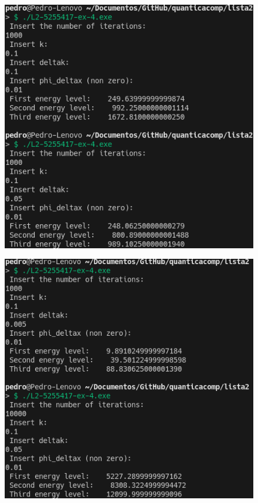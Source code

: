 \documentclass[12pt, a4paper]{article} %
\begin{document}
        \begin{figure}[H]    
            \centering
            \includegraphics[scale=0.5]{../images/results-ex4-3.png}
            \caption{}
        \end{figure}
        \begin{figure}[H]    
            \centering
            \includegraphics[scale=0.5]{../images/results-ex4-4.png}
            \caption{}
        \end{figure}
\end{document}

